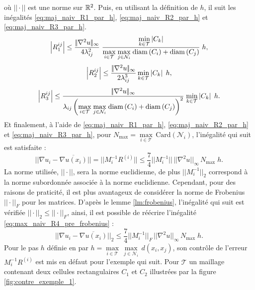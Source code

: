 \documentclass[12pt,a4paper]{article}
\begin{document}
	où $|\!| \cdot |\!|$ est une norme sur $\mathbb{R}^2$. Puis, en utilisant la définition de $h$, il suit les inégalités \eqref{eq:maj_naiv_R1_par_h}, \eqref{eq:maj_naiv_R2_par_h} et \eqref{eq:maj_naiv_R3_par_h}.	
	\begin{equation}\label{eq:maj_naiv_R1_par_h}
		\left\lvert R_1^{ij} \right\rvert \leq \dfrac {|\!|\nabla^2 u|\!|_\infty}{4\lambda_{ij}^2}\;\dfrac{\underset{k\in \mathcal T}\min \left\lvert C_k \right\rvert}{\underset{i\in\mathcal T}\max\;\underset{j\in \mathcal N_i}\max\;\mathrm{diam}\left(C_i\right)+\mathrm{diam}\left(C_j\right)}\; h,
	\end{equation}
	\begin{equation}\label{eq:maj_naiv_R2_par_h}
		\left\lvert R_2^{ij} \right\rvert \leq \dfrac{|\!|\nabla^2 u|\!|_\infty}{2\lambda_{ij}^3}\,\underset{k\in \mathcal T}\min \left\lvert C_k \right\rvert\; h,
	\end{equation}
	\begin{equation}\label{eq:maj_naiv_R3_par_h}
		\left\lvert R_3^{ij} \right\rvert \leq \frac{{|\!|\nabla^2 u|\!|_\infty}}{\lambda_{ij}\left(\underset{i\in\mathcal T}\max\;\underset{j\in \mathcal N_i}\max\;\mathrm{diam}\left(C_i\right)+\mathrm{diam}\left(C_j\right)\right)^2}\;\underset{k\in \mathcal T}\min \left\lvert C_k \right\rvert\; h.
	\end{equation}
	Et finalement, à l'aide de \eqref{eq:maj_naiv_R1_par_h}, \eqref{eq:maj_naiv_R2_par_h} et \eqref{eq:maj_naiv_R3_par_h}, pour $N_{\max} = \underset{i\in\mathcal T}\max\,\text{Card}\left(\mathcal N_i\right)$, l'inégalité qui suit est satisfaite :
	\begin{equation}\label{eq:max_naiv_R4_pre_frobenius}
		|\!| \nabla u_i - \overline{\nabla u(x_i)} |\!| = |\!| M_i^{-1}R^{(i)}|\!| \leq \frac74|\!|M_i^{-1}|\!|\, |\!|\nabla^2 u|\!|_\infty\, N_{\max}\;h.
	\end{equation}
	La norme utilisée, $|\!|\cdot|\!|$, sera la norme euclidienne, de plus $|\!|M_i^{-1}|\!|_2$ correspond à la norme subordonnée associée à la norme euclidienne. Cependant, pour des raisons de praticité, il est plus avantageux de considérer la norme de Frobenius $|\!|\cdot|\!|_F$ pour les matrices. D'après le lemme \ref{lm:frobenius}, l'inégalité qui suit est vérifiée $|\!|\cdot|\!|_2 \leq |\!|\cdot|\!|_F$, ainsi, il est possible de réécrire l'inégalité \eqref{eq:max_naiv_R4_pre_frobenius} :
	\begin{equation}\label{eq:max_naiv_R4}
		|\!| \nabla u_i - \overline{\nabla u(x_i)} |\!|_2 \leq \frac74|\!|M_i^{-1}|\!|_F\, |\!|\nabla^2 u|\!|_\infty\, N_{\max}\;h.
	\end{equation}
	Pour le pas $h$ définie en \cite{ludo} par $h = \underset{i \in \mathcal T}\max\,\underset{j \in \mathcal N_i}\max\, d(x_i,x_j)$, son contrôle de l'erreur $M_i^{-1}R^{(i)}$ est mis en défaut pour l'exemple qui suit. Pour $\mathcal T$ un maillage contenant deux cellules rectangulaires $C_1$ et $C_2$ illustrées par la figure \ref{fig:contre_exemple_1}.
\end{document}

